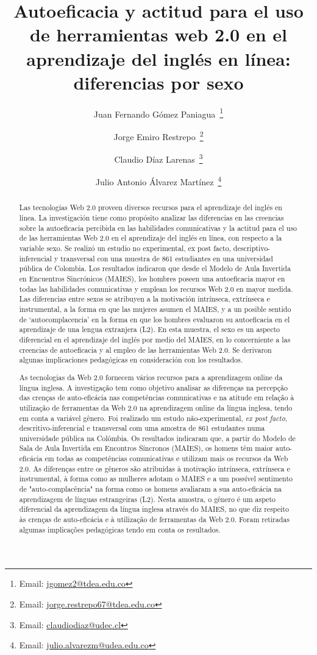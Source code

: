 \documentclass[spanish]{textolivre}
\title{Autoeficacia y actitud para el uso de herramientas web 2.0 en el aprendizaje del inglés en línea: diferencias por sexo}
\author[1]{Juan Fernando Gómez Paniagua~\orcid{0000-0003-1004-6793}\thanks{Email: \href{mailto:jgomez2@tdea.edu.co}{jgomez2@tdea.edu.co}}}
\author[1]{Jorge Emiro Restrepo~\orcid{0000-0001-8790-7454}\thanks{Email: \href{mailto:jorge.restrepo67@tdea.edu.co}{jorge.restrepo67@tdea.edu.co}}}
\author[2]{Claudio Díaz Larenas~\orcid{0000-0003-2394-2378}\thanks{Email: \href{mailto:claudiodiaz@udec.cl}{claudiodiaz@udec.cl}}}
\author[3]{Julio Antonio Álvarez Martínez~\orcid{0000-0001-9481-7422}\thanks{Email: \href{mailto:julio.alvarezm@udea.edu.co}{julio.alvarezm@udea.edu.co}}}
\affil[1]{Tecnológico de Antioquia, Institución Universitaria, Departamento de Ciencias Básicas y Áreas Comunes, Medellín, Colombia.}
\affil[2]{Universidad de Concepción, Facultad de Educación, Departamento de Curriculum e Instrucción, Bío Bío, Chile.}
\affil[3]{Universidad de Antioquia, Escuela de Idiomas, Medellín, Colombia.}
\begin{document}
\maketitle
\begin{polyabstract}
\begin{abstract}
Las tecnologías Web 2.0 proveen diversos recursos para el aprendizaje del inglés en línea. La investigación tiene como propósito analizar las diferencias en las creencias sobre la autoeficacia percibida en las habilidades comunicativas y la actitud para el uso de las herramientas Web 2.0 en el aprendizaje del inglés en línea, con respecto a la variable sexo. Se realizó un estudio no experimental, ex post facto, descriptivo-inferencial y transversal con una muestra de 861 estudiantes en una universidad pública de Colombia. Los resultados indicaron que desde el Modelo de Aula Invertida en Encuentros Sincrónicos (MAIES), los hombres poseen una autoeficacia mayor en todas las habilidades comunicativas y emplean los recursos Web 2.0 en mayor medida. Las diferencias entre sexos se atribuyen a la motivación intrínseca, extrínseca e instrumental, a la forma en que las mujeres asumen el MAIES, y a un posible sentido de ‘autocomplacencia’ en la forma en que los hombres evaluaron su autoeficacia en el aprendizaje de una lengua extranjera (L2). En esta muestra, el sexo es un aspecto diferencial en el aprendizaje del inglés por medio del MAIES, en lo concerniente a las creencias de autoeficacia y al empleo de las herramientas Web 2.0. Se derivaron algunas implicaciones pedagógicas en consideración con los resultados.

\end{abstract}

\begin{portuguese}
\begin{abstract}
As tecnologias da Web 2.0 fornecem vários recursos para a aprendizagem online da língua inglesa. A investigação tem como objetivo analisar as diferenças na percepção das crenças de auto-eficácia nas competências comunicativas e na atitude em relação à utilização de ferramentas da Web 2.0 na aprendizagem online da língua inglesa, tendo em conta a variável gênero. Foi realizado um estudo não-experimental, \textit{ex post facto}, descritivo-inferencial e transversal com uma amostra de 861 estudantes numa universidade pública na Colômbia. Os resultados indicaram que, a partir do Modelo de Sala de Aula Invertida em Encontros Síncronos (MAIES), os homens têm maior auto-eficácia em todas as competências comunicativas e utilizam mais os recursos da Web 2.0. As diferenças entre os gêneros são atribuídas à motivação intrínseca, extrínseca e instrumental, à forma como as mulheres adotam o MAIES e a um possível sentimento de "auto-complacência" na forma como os homens avaliaram a sua auto-eficácia na aprendizagem de línguas estrangeiras (L2). Nesta amostra, o gênero é um aspeto diferencial da aprendizagem da língua inglesa através do MAIES, no que diz respeito às crenças de auto-eficácia e à utilização de ferramentas da Web 2.0. Foram retiradas algumas implicações pedagógicas tendo em conta os resultados.


\end{abstract}
\end{portuguese}
\end{polyabstract}
\end{document}
